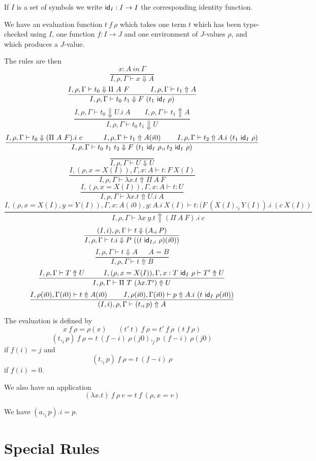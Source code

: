 \documentclass[10pt,a4paper]{article}
\newcommand{\ID}{{\sf id}}
\begin{document}
 If $I$ is a set of symbols we write $\ID_I:I\rightarrow I$ the corresponding identity function.

 We have an evaluation function $t~f~\rho$ which takes one term $t$ which has been type-checked
using $I$, one function $f:I\rightarrow J$ and one environment of $J$-values $\rho$, and which produces
a $J$-value.

 The rules are then
$$
\frac{x:A~in~\Gamma}{I,\rho,\Gamma\vdash x\Downarrow A}
$$
$$
\frac{I,\rho,\Gamma\vdash t_0\Downarrow\Pi~A~F~~~~~~~~~I,\rho,\Gamma\vdash t_1\Uparrow A}
     {I,\rho,\Gamma\vdash t_0~t_1\Downarrow F~(t_1~\ID_I~\rho)}
$$
$$
\frac{I,\rho,\Gamma\vdash t_0\Downarrow U.i~A~~~~~~~~~I,\rho,\Gamma\vdash t_1\Uparrow A}
     {I,\rho,\Gamma\vdash t_0~t_1\Downarrow U}
$$
$$
\frac{I,\rho,\Gamma\vdash t_0\Downarrow (\Pi~A~F).i~c~~~~~~~~~
      I,\rho,\Gamma\vdash t_1\Uparrow A(i0)~~~~~~~
      I,\rho,\Gamma\vdash t_2\Uparrow A.i~(t_1~\ID_I~\rho)}
     {I,\rho,\Gamma\vdash t_0~t_1~t_2\Downarrow F~(t_1~\ID_I~\rho,_i t_2~\ID_I~\rho)}
$$
$$
\frac{}{I,\rho,\Gamma\vdash U\Downarrow U}
$$
$$
\frac{I,(\rho,x=X(I)),\Gamma,x:A\vdash t:F~X(I)}{I,\rho,\Gamma\vdash \lambda x.t\Uparrow \Pi~A~F}
$$
$$
\frac{I,(\rho,x=X(I)),\Gamma,x:A\vdash t:U}{I,\rho,\Gamma\vdash \lambda x.t\Uparrow U.i~A}
$$
$$
\frac{I,(\rho,x=X(I),y=Y(I)),\Gamma,x:A(i0),y:A.i~X(I)\vdash t:(F~(X(I),_i Y(I)).i~(c~X(I))}
     {I,\rho,\Gamma\vdash \lambda x~y.t\Uparrow (\Pi~A~F).i~c}
$$
$$
\frac{(I,i),\rho,\Gamma\vdash t\Downarrow (A,_i P)}
     {I,\rho,\Gamma\vdash t.i\Downarrow P~((t~\ID_{I,i}~\rho)(i0))}
$$
$$
\frac{I,\rho,\Gamma\vdash t\Downarrow A~~~~~~~A = B}{I,\rho,\Gamma\vdash t\Uparrow B}
$$
$$
\frac{I,\rho,\Gamma\vdash T\Uparrow U~~~~~~~~I,(\rho,x=X(I)),\Gamma,x:T~\ID_I~\rho\vdash T'\Uparrow U}
     {I,\rho,\Gamma\vdash \Pi~T~(\lambda x.T')\Uparrow U}
$$
$$
\frac{I,\rho(i0),\Gamma(i0)\vdash t\Uparrow A(i0)~~~~~~~I,\rho(i0),\Gamma(i0)\vdash p\Uparrow A.i~(t~\ID_I~\rho(i0))}
     {(I,i),\rho,\Gamma\vdash (t,_i p)\Uparrow A}
$$

 The evaluation is defined by
$$
x~f~\rho = \rho(x)~~~~~~~(t'~t)~f~\rho = t'~f~\rho~(t~f~\rho)
$$
$$
(t,_i p)~f~\rho = t~(f-i)~\rho(j0),_j p~(f-i)~\rho(j0)
$$
if $f(i) = j$ and 
$$
(t,_i p)~f~\rho = t~(f-i)~\rho
$$
if $f(i) = 0$.

 We also have an application
$$
(\lambda x.t)~f~\rho~v = t~f~(\rho,x=v)
$$

 We have $(a,_i p).i = p$.





\section{Special Rules}
\end{document}
